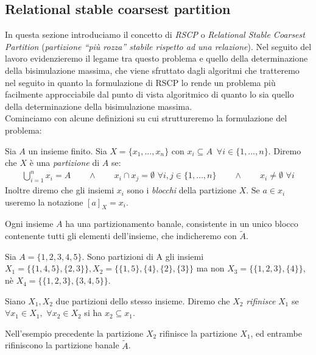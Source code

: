 \subsection{Relational stable coarsest partition}
\label{sec:rscp}
In questa sezione introduciamo il concetto di \emph{RSCP} o \emph{Relational Stable Coarsest Partition} (\emph{partizione ``più rozza'' stabile rispetto ad una relazione}).
Nel seguito del lavoro evidenzieremo il legame tra questo problema e quello della determinazione della bisimulazione massima, che viene sfruttato dagli algoritmi
che tratteremo nel seguito in quanto la formulazione di RSCP lo rende un problema più facilmente approcciabile dal punto di vista algoritmico di quanto lo sia quello della determinazione della
bisimulazione massima.\\
Cominciamo con alcune definizioni su cui struttureremo la formulazione del problema:
\begin{definition}
    Sia $A$ un insieme finito. Sia $X = \{x_1, \dots, x_n\}$ con $x_i \subseteq A \,\,\,\forall i \in \{1,\dots,n\}$. Diremo che $X$ è una \emph{partizione}
    di $A$ se:
    \begin{gather*}
        \bigcup_{i = 1}^n x_i = A \qquad \land \qquad x_i \cap x_j = \emptyset \,\,\forall i,j \in \{1,\dots,n\} \qquad \land \qquad x_i \neq \emptyset \,\,\forall i
    \end{gather*}
    Inoltre diremo che gli insiemi $x_i$ sono i \emph{blocchi} della partizione $X$. Se $a \in x_i$ useremo la notazione $[a]_X = x_i$.
\end{definition}
\begin{observation}
    Ogni insieme $A$ ha una partizionamento banale, consistente in un unico blocco contenente tutti gli elementi dell'insieme, che indicheremo con $\widetilde{A}$.
\end{observation}
\begin{example}
    Sia $A = \{1,2,3,4,5\}$. Sono partizioni di A gli insiemi $X_1 = \{\{1,4,5\},\{2,3\}\}, X_2 = \{\{1,5\},\{4\},\{2\},\{3\}\}$ ma non $X_3 = \{\{1,2,3\},\{4\}\}$,
    nè $X_4 = \{\{1,2,3\},\{3,4,5\}\}$.
    \label{exa:set_partition}
\end{example}
\begin{definition}
    Siano $X_1,X_2$ due partizioni dello stesso insieme. Diremo che $X_2$ \emph{rifinisce} $X_1$ se $\forall x_1 \in X_1, \,\,\forall x_2 \in X_2$ si ha $x_2 \subseteq x_1$.
\end{definition}
\begin{example}
    Nell'esempio precedente la partizione $X_2$ rifinisce la partizione $X_1$, ed entrambe rifiniscono la partizione banale $\widetilde{A}$.
\end{example}
